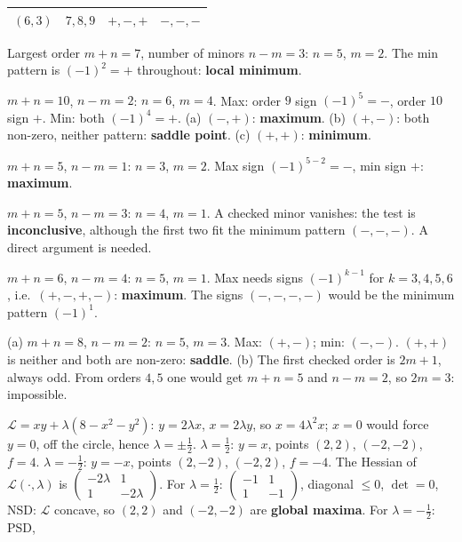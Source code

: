 \begin{solutions}
\begin{center}
\begin{tabular}{cccc}
          $(6,3)$ & $7,8,9$ & $+,-,+$ & $-,-,-$\\
          \hline
        \end{tabular}
        \end{center}
  \item Largest order $m+n=7$, number of minors $n-m=3$: $n=5$, $m=2$. The
        min pattern is $(-1)^{2}=+$ throughout: \textbf{local minimum}.
  \item $m+n=10$, $n-m=2$: $n=6$, $m=4$. Max: order $9$ sign
        $(-1)^{5}=-$, order $10$ sign $+$. Min: both $(-1)^{4}=+$.
        (a) $(-,+)$: \textbf{maximum}. (b) $(+,-)$: both non-zero, neither
        pattern: \textbf{saddle point}. (c) $(+,+)$: \textbf{minimum}.
  \item $m+n=5$, $n-m=1$: $n=3$, $m=2$. Max sign $(-1)^{5-2}=-$, min sign
        $+$: \textbf{maximum}.
  \item $m+n=5$, $n-m=3$: $n=4$, $m=1$. A checked minor vanishes: the test
        is \textbf{inconclusive}, although the first two fit the minimum
        pattern $(-,-,-)$. A direct argument is needed.
  \item $m+n=6$, $n-m=4$: $n=5$, $m=1$. Max needs signs $(-1)^{k-1}$ for
        $k=3,4,5,6$, i.e.\ $(+,-,+,-)$: \textbf{maximum}. The signs
        $(-,-,-,-)$ would be the minimum pattern $(-1)^{1}$.
  \item (a) $m+n=8$, $n-m=2$: $n=5$, $m=3$. Max: $(+,-)$; min: $(-,-)$.
        $(+,+)$ is neither and both are non-zero: \textbf{saddle}.
        (b) The first checked order is $2m+1$, always odd. From orders
        $4,5$ one would get $m+n=5$ and $n-m=2$, so $2m=3$: impossible.
  \item $\mathcal{L}=xy+\lambda(8-x^{2}-y^{2})$: $y=2\lambda x$,
        $x=2\lambda y$, so $x=4\lambda^{2}x$; $x=0$ would force $y=0$, off
        the circle, hence $\lambda=\pm\tfrac12$. $\lambda=\tfrac12$: $y=x$,
        points $(2,2)$, $(-2,-2)$, $f=4$. $\lambda=-\tfrac12$: $y=-x$,
        points $(2,-2)$, $(-2,2)$, $f=-4$. The Hessian of
        $\mathcal{L}(\cdot,\lambda)$ is
        $\begin{pmatrix}-2\lambda&1\\1&-2\lambda\end{pmatrix}$. For
        $\lambda=\tfrac12$: $\begin{pmatrix}-1&1\\1&-1\end{pmatrix}$,
        diagonal $\le0$, $\det=0$, NSD: $\mathcal{L}$ concave, so $(2,2)$ and
        $(-2,-2)$ are \textbf{global maxima}. For $\lambda=-\tfrac12$: PSD,

\end{solutions}
